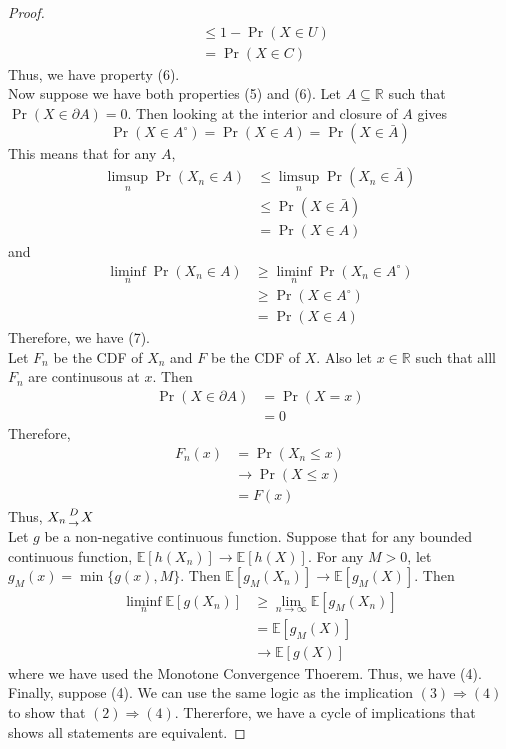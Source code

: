 \documentclass{article}
\theoremstyle{definition}\newtheorem{definition}{DEF}
\theoremstyle{definition}\newtheorem{example}{Ex}
\theoremstyle{lemma}\newtheorem{lemma}{Lemma}
\theoremstyle{corrolary}\newtheorem{corrolary}{Cor}
\begin{document}
\begin{proof}
\begin{align*}
&\leq 1 - \Pr \left( X \in U \right) \\
&= \Pr \left( X \in C \right)
\end{align*}
Thus, we have property (6). \\
Now suppose we have both properties (5) and (6).
Let $A \subseteq \mathbb{R}$ such that $\Pr\left( X \in \partial A \right) =0$.
Then looking at the interior and closure of $A$ gives
\begin{equation*}
\Pr \left( X \in A^{\circ} \right) 
= \Pr \left( X \in A \right)
= \Pr \left( X \in \bar{A} \right)
\end{equation*}
This means that for any $A$,
\begin{align*}
\limsup_n \Pr \left( X_n \in A \right)
&\leq \limsup_n \Pr \left( X_n \in \bar{A} \right) \\
&\leq \Pr \left( X \in \bar{A} \right) \\
&= \Pr \left( X \in A \right)
\end{align*}
and
\begin{align*}
\liminf_n \Pr \left( X_n \in A \right)
&\geq \liminf_n \Pr \left( X_n \in A^{\circ} \right) \\
&\geq \Pr \left( X \in A^{\circ} \right) \\
&= \Pr \left( X \in A \right)
\end{align*}
Therefore, we have (7). \\
Let $F_n$ be the CDF of $X_n$ and $F$ be the CDF of $X$.
Also let $x\in \mathbb{R}$ such that alll $F_n$ are continusous at $x$.
Then 
\begin{align*}
\Pr\left(X \in \partial A \right)
&= \Pr \left( X=x \right) \\
&=0
\end{align*}
Therefore, 
\begin{align*}
F_n \left( x \right)
&= \Pr \left( X_n\leq x\right)\\
&\rightarrow \Pr \left( X\leq x\right) \\
&=F\left( x \right)
\end{align*}
Thus, $X_n {D \atop \rightarrow} X$\\
Let $g$ be a non-negative continuous function.
Suppose that for any bounded continuous function, $\mathbb{E}[h(X_n)] \rightarrow \mathbb{E}[h(X)]$.
For any $M>0$, let $g_M(x)=\min\{g(x), M\}$.
Then $\mathbb{E}[g_M(X_n)]\rightarrow \mathbb{E}[g_M(X)]$.
Then
\begin{align*}
\liminf_n \mathbb{E}[g(X_n)]
&\geq \lim_{n\rightarrow \infty} \mathbb{E}[g_M(X_n)] \\
&= \mathbb{E}[g_M(X)] \\
&\rightarrow \mathbb{E}[g(X)]
\end{align*}
where we have used the Monotone Convergence Thoerem. Thus, we have (4).\\
Finally, suppose (4).
We can use the same logic as the implication $(3) \Rightarrow (4)$ to show that $(2) \Rightarrow (4)$.
Thererfore, we have a cycle of implications that shows all statements are equivalent.
\end{proof}
\end{document}
